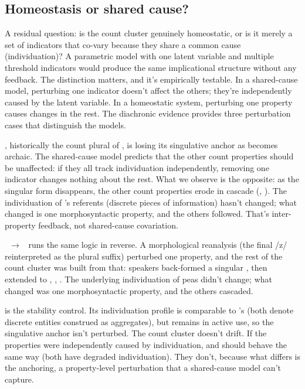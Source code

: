 \documentclass[12pt,a4paper]{article}
\begin{document}
\subsection{Homeostasis or shared cause?}\label{sec:shared-cause}

A residual question: is the count cluster genuinely homeostatic, or is it merely a set of indicators that co-vary because they share a common cause (individuation)? A parametric model with one latent variable and multiple threshold indicators would produce the same implicational structure without any feedback. The distinction matters, and it's empirically testable. In a shared-cause model, perturbing one indicator doesn't affect the others; they're independently caused by the latent variable. In a homeostatic system, perturbing one property causes changes in the rest. The diachronic evidence provides three perturbation cases that distinguish the models.

, historically the count plural of , is losing its singulative anchor as  becomes archaic. The shared-cause model predicts that the other count properties should be unaffected: if they all track individuation independently, removing one indicator changes nothing about the rest. What we observe is the opposite: as the singular form disappears, the other count properties erode in cascade (, ). The individuation of 's referents (discrete pieces of information) hasn't changed; what changed is one morphosyntactic property, and the others followed. That's inter-property feedback, not shared-cause covariation.

~$\to$~ runs the same logic in reverse. A morphological reanalysis (the final /z/ reinterpreted as the plural suffix) perturbed one property, and the rest of the count cluster was built from that: speakers back-formed a singular , then extended to , , . The underlying individuation of peas didn't change; what changed was one morphosyntactic property, and the others cascaded.

 is the stability control. Its individuation profile is comparable to 's (both denote discrete entities construed as aggregates), but  remains in active use, so the singulative anchor isn't perturbed. The count cluster doesn't drift. If the properties were independently caused by individuation,  and  should behave the same way (both have degraded individuation). They don't, because what differs is the anchoring, a property-level perturbation that a shared-cause model can't capture.
\end{document}
